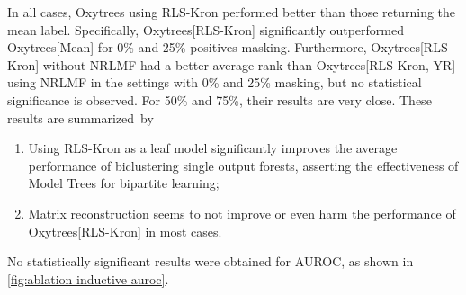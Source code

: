 \documentclass[sn-mathphys-num]{sn-jnl}%
\theoremstyle{thmstyleone}%
\theoremstyle{thmstyletwo}%
\theoremstyle{thmstylethree}%
\begin{document}
In all cases, Oxytrees using RLS-Kron performed better than those returning the mean label. Specifically, Oxytrees[RLS-Kron] significantly outperformed Oxytrees[Mean] for 0\% and 25\% positives masking. Furthermore, Oxytrees[RLS-Kron] without NRLMF had a better average rank than Oxytrees[RLS-Kron, YR] using NRLMF in the settings with 0\% and 25\% masking, but no statistical significance is observed. For 50\% and 75\%, their results are very close.
%
These results are summarized~by
%
\begin{enumerate}
    \item Using RLS-Kron as a leaf model significantly improves the average performance of biclustering single output forests, asserting the effectiveness of Model Trees for bipartite learning;
    \item Matrix reconstruction seems to not improve or even harm the performance of Oxytrees[RLS-Kron] in most cases.
\end{enumerate}
%

%
No statistically significant results were obtained for AUROC, as shown in \autoref{fig:ablation inductive auroc}.%

\end{document}
